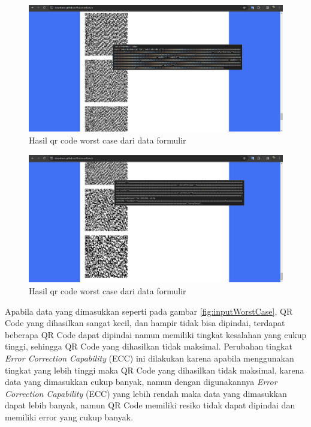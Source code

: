 \begin{figure}[H]
	\centering
	\includegraphics[scale=0.4]{Gambar/worst2.png}
	\caption{Hasil qr code worst case dari data formulir} 
	\label{fig:qrCodeWorstCase2}
\end{figure}

\begin{figure}[H]
	\centering
	\includegraphics[scale=0.4]{Gambar/worst3.png}
	\caption{Hasil qr code worst case dari data formulir} 
	\label{fig:qrCodeWorstCase3}
\end{figure}

Apabila data yang dimasukkan seperti pada gambar \ref{fig:inputWorstCase}, QR Code yang dihasilkan sangat kecil, dan hampir tidak bisa dipindai, terdapat beberapa QR Code dapat dipindai namun memiliki tingkat kesalahan yang cukup tinggi, sehingga QR Code yang dihasilkan tidak maksimal. Perubahan tingkat \textit{Error Correction Capability} (ECC) ini dilakukan karena apabila menggunakan tingkat yang lebih tinggi maka QR Code yang dihasilkan tidak maksimal, karena data yang dimasukkan cukup banyak, namun dengan digunakannya \textit{Error Correction Capability} (ECC) yang lebih rendah maka data yang dimasukkan dapat lebih banyak, namun QR Code memiliki resiko tidak dapat dipindai dan memiliki error yang cukup banyak.





